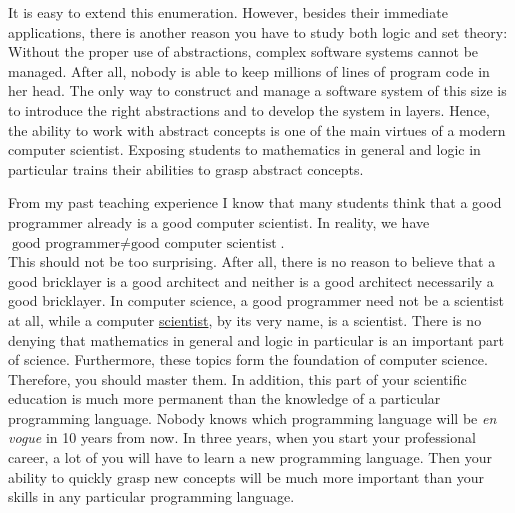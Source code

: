It is easy to extend this enumeration.  However, besides their immediate applications, 
there is another reason you have to study both logic and set theory: Without the proper use of
{\color{blue}abstractions}, complex software systems cannot be managed.  After all, nobody is able to keep
millions of lines of program code in her head.  The only way to construct and manage a software system of this
size is to introduce the right abstractions and to develop the system in layers.  Hence, the ability
to work with abstract concepts is one of the main virtues of a modern computer scientist.  
Exposing students to mathematics in general and logic in particular trains their abilities to grasp abstract concepts.

From my past teaching experience I know that many students think that a good programmer already is a
good computer scientist.  In reality, we have
\\[0.2cm]
\hspace*{1.3cm}
$\textrm{good programmer} \not= \textrm{good computer scientist}$.
\\[0.2cm]
This should not be too surprising.  After all, there is no reason to believe that a good bricklayer is a good
architect and neither is a good architect necessarily a good bricklayer.
In computer science, a good programmer need not be a scientist at all, while a {\color{blue}computer
  \underline{scientist}}, by its very name, is a {\color{blue}scientist}.  
There is no denying that {\color{blue}mathematics} in general and 
{\color{blue}logic} in particular is an important part of science.  Furthermore, these topics form the
foundation of computer science.  Therefore, you should master them.  In addition, this
part of your scientific education is much more permanent than the knowledge of a particular programming
language.  Nobody knows which programming language will be \emph{en vogue} in 10 years from now.  In three 
years, when you start your professional career, a lot of you will have to learn a new
programming language.   Then your ability to quickly grasp new concepts will be much more important than your
skills in any particular programming language. 


